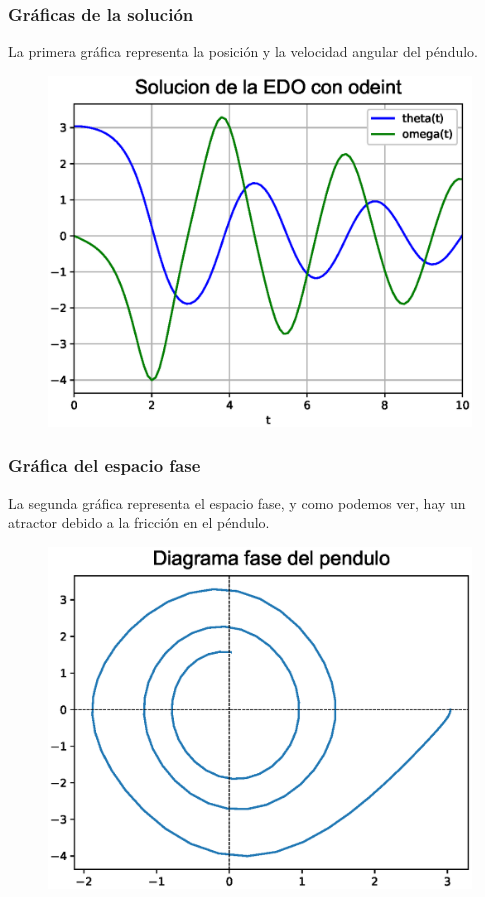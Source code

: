 \begin{frame}[plain]
\frametitle{Gráficas de la solución}
La primera gráfica representa la posición y la velocidad angular del péndulo.
\begin{figure}
    \centering
    \includegraphics[scale=0.5]{Imagenes/sol_odeint_01.eps}
\end{figure}
\end{frame}
\begin{frame}[plain]
\frametitle{Gráfica del espacio fase}
La segunda gráfica representa el espacio fase, y como podemos ver, hay un atractor debido a la fricción en el péndulo.
\begin{figure}
    \centering
    \includegraphics[scale=0.5]{Imagenes/sol_odeint_02.eps}
\end{figure}
\end{frame}
